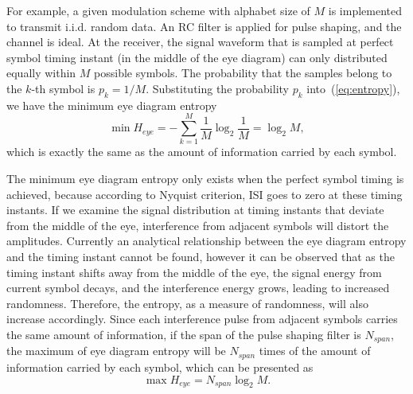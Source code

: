 \documentclass[journal,comsoc]{IEEEtran}
\begin{document}
For example, a given modulation scheme with alphabet size of \(M\) is implemented to transmit i.i.d. random data. 
An RC filter is applied for pulse shaping, and the channel is ideal.
At the receiver, the signal waveform that is sampled at perfect symbol timing instant (in the middle of the eye diagram) can only distributed equally within \(M\) possible symbols.
The probability that the samples belong to the $k$-th symbol is \(p_k=1/M\).
Substituting the probability \(p_k\) into~(\ref{eq:entropy}), we have the minimum eye diagram entropy
\begin{equation}
\min{H_{eye}} =  - \sum\limits_{k = 1}^M {{\frac{1}{M}}\log_2 {\frac{1}{M}}}=\log_2 {M},
\label{eq:entropy_mid}
\end{equation}
which is exactly the same as the amount of information carried by each symbol.


The minimum eye diagram entropy only exists when the perfect symbol timing is achieved, because according to Nyquist criterion, ISI goes to zero at these timing instants.
If we examine the signal distribution at timing instants that deviate from the middle of the eye, interference from adjacent symbols will distort the amplitudes.
Currently an analytical relationship between the eye diagram entropy and the timing instant cannot be found, however it can be observed that 
as the timing instant shifts away from the middle of the eye, the signal energy from current symbol decays, and the interference energy grows, leading to increased randomness.
% 
% 
Therefore, the entropy, as a measure of randomness, will also increase accordingly.
Since each interference pulse from adjacent symbols carries the same amount of information, 
if the span of the pulse shaping filter is \(N_{span}\), 
the maximum of eye diagram entropy will be \(N_{span}\) times of the amount of information carried by each symbol, which can be presented as
% 
% 
\begin{equation}
\max{H_{eye}} =  N_{span}\log_2 {M}.
\label{eq:entropy_neb}
\end{equation}
\end{document}
